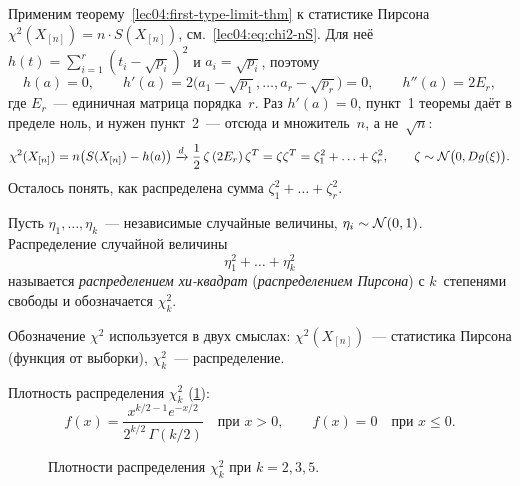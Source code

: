 Применим теорему~\ref{lec04:first-type-limit-thm} к статистике Пирсона
$\chi^2(X_{[n]}) = n \cdot S(X_{[n]})$, см.~\cref{lec04:eq:chi2-nS}.
Для неё $h(t) = \sum_{i=1}^r (t_i - \sqrt{p_i})^2$ и $a_i = \sqrt{p_i}$, поэтому
\[
  h(a) = 0, \qquad
  h'(a) = 2\bigl(a_1 - \sqrt{p_1}, \ldots, a_r - \sqrt{p_r}\bigr) = 0, \qquad
  h''(a) = 2E_r,
\]
где $E_r$~--- единичная матрица порядка~$r$. Раз $h'(a) = 0$, пункт~1 теоремы даёт
в пределе ноль, и нужен пункт~2~--- отсюда и множитель~$n$, а не~$\sqrt{n}$:
\begin{equation}
  \label{lec04:eq:chi2-zeta}
  \chi^2(X_{[n]}) = n\bigl(S(X_{[n]}) - h(a)\bigr)
  \xrightarrow{d} \frac12\, \zeta\, (2E_r)\, \zeta^T = \zeta \zeta^T = \zeta_1^2 + \ldots + \zeta_r^2,
  \qquad \zeta \sim \mathcal{N}\bigl(0, D g(\xi)\bigr).
\end{equation}
Осталось понять, как распределена сумма $\zeta_1^2 + \ldots + \zeta_r^2$.

\begin{definition}
  Пусть $\eta_1, \ldots, \eta_k$~--- независимые случайные величины,
  $\eta_i \sim \mathcal{N}(0, 1)$. Распределение случайной величины
  \[
    \eta_1^2 + \ldots + \eta_k^2
  \]
  называется \emph{распределением хи-квадрат} (\emph{распределением Пирсона})
  с $k$~степенями свободы и обозначается $\chi^2_k$.
\end{definition}

Обозначение $\chi^2$ используется в двух смыслах: $\chi^2(X_{[n]})$~--- статистика
Пирсона (функция от выборки), $\chi^2_k$~--- распределение.

\begin{remark}
  Плотность распределения $\chi^2_k$ (\cref{lec04:fig:chi2-densities}):
  \[
    f(x) = \frac{x^{k/2 - 1} e^{-x/2}}{2^{k/2}\, \Gamma(k/2)} \quad \text{при } x > 0,
    \qquad f(x) = 0 \quad \text{при } x \le 0.
  \]
\end{remark}

\begin{figure}[h]
  \centering
  \caption{Плотности распределения $\chi^2_k$ при $k = 2, 3, 5$.}
  \label{lec04:fig:chi2-densities}
\end{figure}

